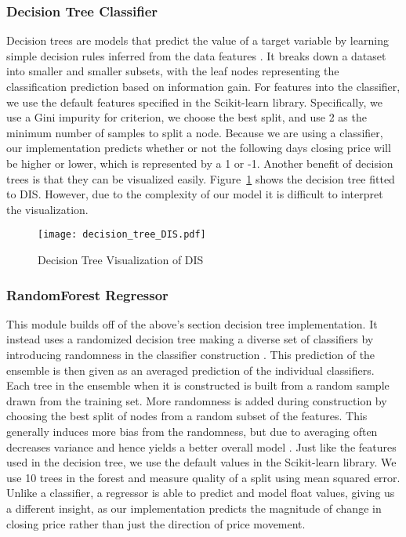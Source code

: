 \documentclass[../thesis.tex]{subfiles}
\begin{document}
\subsubsection{Decision Tree Classifier}
Decision trees are models that predict the value of a target variable by learning simple decision rules inferred from the data features \cite{PedregosaFABIANPEDREGOSA2011}. It breaks down a dataset into smaller and smaller subsets, with the leaf nodes representing the classification prediction based on information gain. For features into the classifier, we use the default features specified in the Scikit-learn library. Specifically, we use a Gini impurity for criterion, we choose the best split, and use 2 as the minimum number of samples to split a node. Because we are using a classifier, our implementation predicts whether or not the following days closing price will be higher or lower, which is represented by a 1 or -1. Another benefit of decision trees is that they can be visualized easily. Figure~\ref{DecTreefigure} shows the decision tree fitted to DIS. However, due to the complexity of our model it is difficult to interpret the visualization. 

\begin{figure}[h]
\centering
\texttt{[image: decision\_tree\_DIS.pdf]}
\caption{Decision Tree Visualization of DIS \label{overflow}}
\label{DecTreefigure}
\end{figure}

\subsubsection{RandomForest Regressor}
This module builds off of the above's section decision tree implementation. It instead uses a randomized decision tree making a diverse set of classifiers by introducing randomness in the classifier construction \cite{PedregosaFABIANPEDREGOSA2011}. This prediction of the ensemble is then given as an averaged prediction of the individual classifiers. Each tree in the ensemble when it is constructed is built from a random sample drawn from the training set. More randomness is added during construction by choosing the best split of nodes from a random subset of the features. This generally induces more bias from the randomness, but due to averaging often decreases variance and hence yields a better overall model \cite{PedregosaFABIANPEDREGOSA2011}. Just like the features used in the decision tree, we use the default values in the Scikit-learn library. We use 10 trees in the forest and measure quality of a split using mean squared error. Unlike a classifier, a regressor is able to predict and model float values, giving us a different insight, as our implementation predicts the magnitude of change in closing price rather than just the direction of price movement. 
\end{document}
